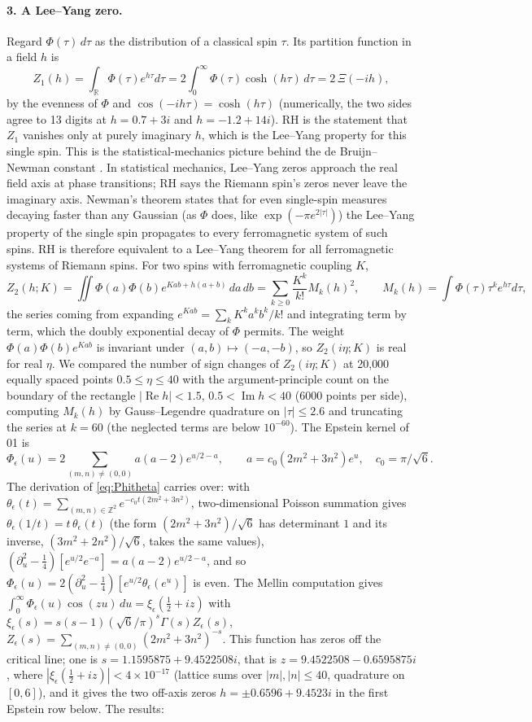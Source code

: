 \documentclass[11pt]{article}
\theoremstyle{definition}\newtheorem{definition}[theorem]{Definition}
\theoremstyle{remark}\newtheorem{remark}[theorem]{Remark}
\newcommand{\R}{\mathbb R}\newcommand{\C}{\mathbb C}\newcommand{\N}{\mathbb N}
\renewcommand{\Re}{\operatorname{Re}}\renewcommand{\Im}{\operatorname{Im}}
\begin{document}
\paragraph{3. A Lee--Yang zero.} Regard $\Phi(\tau)\,d\tau$ as the distribution of a classical spin $\tau$. Its partition function in a field $h$ is
\[
Z_1(h)=\int_\R\Phi(\tau)e^{h\tau}d\tau=2\int_0^\infty\Phi(\tau)\cosh(h\tau)\,d\tau=2\,\Xi(-ih),
\]
by the evenness of $\Phi$ and $\cos(-ih\tau)=\cosh(h\tau)$ (numerically, the two sides agree to 13 digits at $h=0.7+3i$ and $h=-1.2+14i$). RH is the statement that $Z_1$ vanishes only at purely imaginary $h$, which is the Lee--Yang property \cite{LeeYang} for this single spin. This is the statistical-mechanics picture behind the de Bruijn--Newman constant \cite{Newman74,Newman76,NewmanWu,RodgersTao}. In statistical mechanics, Lee--Yang zeros approach the real field axis at phase transitions; RH says the Riemann spin's zeros never leave the imaginary axis. Newman's theorem \cite{Newman74} states that for even single-spin measures decaying faster than any Gaussian (as $\Phi$ does, like $\exp(-\pi e^{2|\tau|})$) the Lee--Yang property of the single spin propagates to every ferromagnetic system of such spins. RH is therefore equivalent to a Lee--Yang theorem for all ferromagnetic systems of Riemann spins. For two spins with ferromagnetic coupling $K$,
\[
Z_2(h;K)=\iint\Phi(a)\Phi(b)e^{Kab+h(a+b)}\,da\,db=\sum_{k\ge0}\frac{K^k}{k!}M_k(h)^2,\qquad M_k(h)=\int\Phi(\tau)\tau^ke^{h\tau}d\tau ,
\]
the series coming from expanding $e^{Kab}=\sum_kK^ka^kb^k/k!$ and integrating term by term, which the doubly exponential decay of $\Phi$ permits. The weight $\Phi(a)\Phi(b)e^{Kab}$ is invariant under $(a,b)\mapsto(-a,-b)$, so $Z_2(i\eta;K)$ is real for real $\eta$. We compared the number of sign changes of $Z_2(i\eta;K)$ at 20{,}000 equally spaced points $0.5\le\eta\le40$ with the argument-principle count on the boundary of the rectangle $|\Re h|<1.5$, $0.5<\Im h<40$ (6000 points per side), computing $M_k(h)$ by Gauss--Legendre quadrature on $|\tau|\le2.6$ and truncating the series at $k=60$ (the neglected terms are below $10^{-60}$). The Epstein kernel of 01 is
\[
\Phi_\epsilon(u)=2\sum_{(m,n)\ne(0,0)}a(a-2)e^{u/2-a},\qquad a=c_0(2m^2+3n^2)e^{u},\quad c_0=\pi/\sqrt6 .
\]
The derivation of \eqref{eq:Phitheta} carries over: with $\theta_\epsilon(t)=\sum_{(m,n)\in\mathbb Z^2}e^{-c_0t(2m^2+3n^2)}$, two-dimensional Poisson summation gives $\theta_\epsilon(1/t)=t\,\theta_\epsilon(t)$ (the form $(2m^2+3n^2)/\sqrt6$ has determinant $1$ and its inverse, $(3m^2+2n^2)/\sqrt6$, takes the same values), $(\partial_u^2-\frac14)[e^{u/2}e^{-a}]=a(a-2)e^{u/2-a}$, and so $\Phi_\epsilon(u)=2(\partial_u^2-\frac14)[e^{u/2}\theta_\epsilon(e^u)]$ is even. The Mellin computation gives $\int_0^\infty\Phi_\epsilon(u)\cos(zu)\,du=\xi_\epsilon(\frac12+iz)$ with $\xi_\epsilon(s)=s(s-1)(\sqrt6/\pi)^s\Gamma(s)Z_\epsilon(s)$, $Z_\epsilon(s)=\sum_{(m,n)\ne(0,0)}(2m^2+3n^2)^{-s}$. This function has zeros off the critical line; one is $s=1.1595875+9.4522508i$, that is $z=9.4522508-0.6595875i$, where $|\xi_\epsilon(\frac12+iz)|<4\times10^{-17}$ (lattice sums over $|m|,|n|\le40$, quadrature on $[0,6]$), and it gives the two off-axis zeros $h=\pm0.6596+9.4523i$ in the first Epstein row below. The results:
\end{document}
